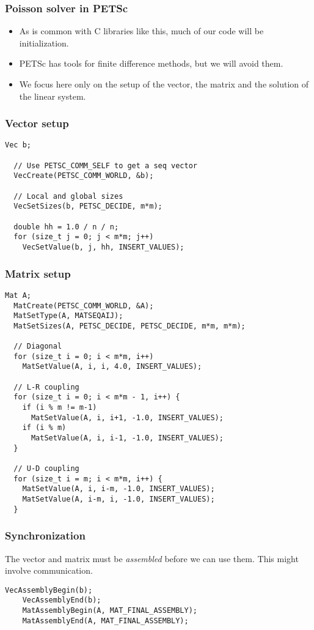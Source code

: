 \begin{frame}
  \frametitle{Poisson solver in PETSc}
  \begin{itemize}
  \item As is common with C libraries like this, much of our code will be
    initialization.
  \item PETSc has tools for finite difference methods, but we will avoid them.
  \item We focus here only on the setup of the vector, the matrix and the
    solution of the linear system.
  \end{itemize}
\end{frame}

\begin{frame}[fragile]
  \frametitle{Vector setup}
  \begin{lstlisting}[style=c]
  Vec b;

  // Use PETSC_COMM_SELF to get a seq vector
  VecCreate(PETSC_COMM_WORLD, &b);

  // Local and global sizes
  VecSetSizes(b, PETSC_DECIDE, m*m);

  double hh = 1.0 / n / n;
  for (size_t j = 0; j < m*m; j++)
    VecSetValue(b, j, hh, INSERT_VALUES);
  \end{lstlisting}
\end{frame}

\begin{frame}[fragile]
  \frametitle{Matrix setup}
  \begin{lstlisting}[style=c, basicstyle=\ttfamily\scriptsize]
  Mat A;
  MatCreate(PETSC_COMM_WORLD, &A);
  MatSetType(A, MATSEQAIJ);
  MatSetSizes(A, PETSC_DECIDE, PETSC_DECIDE, m*m, m*m);

  // Diagonal
  for (size_t i = 0; i < m*m, i++)
    MatSetValue(A, i, i, 4.0, INSERT_VALUES);

  // L-R coupling
  for (size_t i = 0; i < m*m - 1, i++) {
    if (i % m != m-1)
      MatSetValue(A, i, i+1, -1.0, INSERT_VALUES);
    if (i % m)
      MatSetValue(A, i, i-1, -1.0, INSERT_VALUES);
  }

  // U-D coupling
  for (size_t i = m; i < m*m, i++) {
    MatSetValue(A, i, i-m, -1.0, INSERT_VALUES);
    MatSetValue(A, i-m, i, -1.0, INSERT_VALUES);
  }
  \end{lstlisting}
\end{frame}

\begin{frame}[fragile]
  \frametitle{Synchronization}
  The vector and matrix must be \emph{assembled} before we can use them. This
  might involve communication.
  \begin{lstlisting}[style=c]
    VecAssemblyBegin(b);
    VecAssemblyEnd(b);
    MatAssemblyBegin(A, MAT_FINAL_ASSEMBLY);
    MatAssemblyEnd(A, MAT_FINAL_ASSEMBLY);
  \end{lstlisting}
\end{frame}

